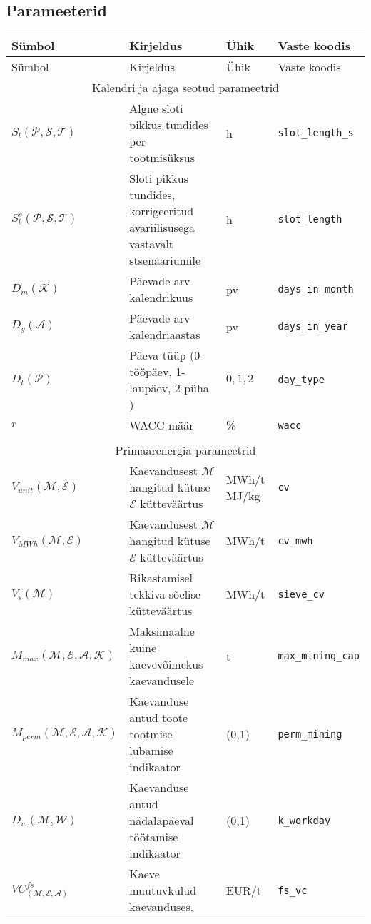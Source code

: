 \begin{landscape}
\section{Parameeterid}
\label{app:parameetrid}

\begin{longtable}{l l l l}
Sümbol & Kirjeldus & Ühik & Vaste koodis\\
\hline
\endfirsthead

Sümbol & Kirjeldus & Ühik & Vaste koodis\\
\hline
\endhead

\multicolumn{4}{c}{Kalendri ja ajaga seotud parameetrid} \\
$S_l(\mathcal{P}, \mathcal{S},\mathcal{T})$     & Algne sloti pikkus tundides per tootmisüksus & h & \texttt{slot\_length\_s} \\
$S^s_l(\mathcal{P}, \mathcal{S}, \mathcal{T})$  & Sloti pikkus tundides, korrigeeritud avariilisusega vastavalt stsenaariumile & h & \texttt{slot\_length} \\
$D_m(\mathcal{K})$ & Päevade arv kalendrikuus   & pv & \texttt{days\_in\_month} \\
$D_y(\mathcal{A})$ & Päevade arv kalendriaastas & pv & \texttt{days\_in\_year} \\
$D_t(\mathcal{P})$ & Päeva tüüp (0-tööpäev, 1-laupäev, 2-püha )& ${0,1,2}$ & \texttt{day\_type} \\
$r$ & WACC määr & \% & \texttt{wacc} \\


\\ \multicolumn{4}{c}{Primaarenergia parameetrid} \\
$\mathit{V}_{unit}(\mathcal{M}, \mathcal{E})$ & Kaevandusest $\mathcal{M}$ hangitud kütuse $\mathcal{E}$ kütteväärtus  & MWh/t MJ/kg& \texttt{cv}\\
$\mathit{V}_{MWh}(\mathcal{M}, \mathcal{E}) $ & Kaevandusest $\mathcal{M}$ hangitud kütuse $\mathcal{E}$ kütteväärtus  & MWh/t      & \texttt{cv\_mwh}\\
$\mathit{V}_s(\mathcal{M})$                   & Rikastamisel tekkiva sõelise kütteväärtus                              & MWh/t      & \texttt{sieve\_cv} \\ 

$\mathit{M}_{max}(\mathcal{M}, \mathcal{E},\mathcal{A}, \mathcal{K})$ & Maksimaalne kuine kaevevõimekus kaevandusele & t & \texttt{max\_mining\_cap} \\
$\mathit{M}_{perm}(\mathcal{M}, \mathcal{E},\mathcal{A}, \mathcal{K})$& Kaevanduse antud toote tootmise lubamise indikaator &(0,1)& \texttt{perm\_mining} \\
$\mathit{D}_w(\mathcal{M}, \mathcal{W})$ & Kaevanduse antud nädalapäeval töötamise indikaator &(0,1)& \texttt{k\_workday} \\
$\mathit{VC}^{fs}_(\mathcal{M}, \mathcal{E}, \mathcal{A})$ & Kaeve muutuvkulud kaevanduses. & EUR/t & \texttt{fs\_vc} \\


\end{longtable}
\end{landscape}
